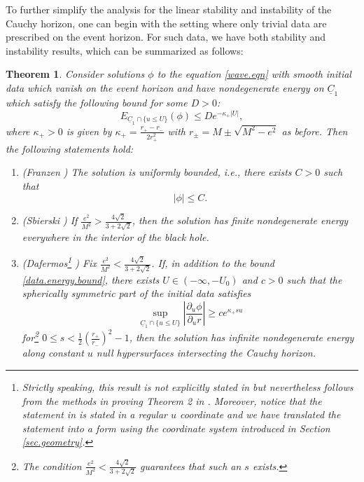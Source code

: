 \documentclass[12 pt, reqno]{amsart}
\newtheorem{theorem}{Theorem}[section]
\theoremstyle{definition}
\theoremstyle{remark}
\numberwithin{equation}{section}
\newcommand{\rd}{\partial}
\newcommand{\0}{\emptyset}
\newcommand{\f}{\frac}
\begin{document}
To further simplify the analysis for the linear stability and instability of the Cauchy horizon, one can begin with the setting where only trivial data are prescribed on the event horizon. For such data, we have both stability and instability results, which can be summarized as follows:
\begin{theorem}\label{thm.linear.hor}
Consider solutions $\phi$ to the equation \eqref{wave.eqn} with smooth initial data which vanish on the event horizon and have nondegenerate energy on $\underline C_1$ which satisfy the following bound for some $D>0$:
\begin{equation}\label{data.energy.bound}
E_{\underline C_1\cap \{u\leq U\}}(\phi)\leq De^{-\kappa_+ |U|},
\end{equation}
where $\kappa_+>0$ is given by $\kappa_+=\f{r_+-r_-}{2r_+^2}$ with $r_\pm=M\pm \sqrt{M^2-e^2}$ as before.
Then the following statements hold:
\begin{enumerate}
\item (Franzen \cite{Fra}) The solution is uniformly bounded, i.e., there exists $C>0$ such that
$$|\phi|\leq C.$$
\item (Sbierski \cite{Sbi.2}) If $\f{e^2}{M^2}>\f{4\sqrt 2}{3+2\sqrt 2}$, then the solution has finite nondegenerate energy everywhere in the interior of the black hole.
\item (Dafermos\footnote{Strictly speaking, this result is not explicitly stated in \cite{D1} but nevertheless follows from the methods in proving Theorem 2 in \cite{D1}. Moreover, notice that the statement in \cite{D1} is stated in a regular $u$ coordinate and we have translated the statement into a form using the coordinate system introduced in Section \ref{sec.geometry}.} \cite{D1}) Fix $\f{e^2}{M^2}<\f{4\sqrt 2}{3+2\sqrt 2}$. If, in addition to the bound \eqref{data.energy.bound}, there exists $U\in (-\infty,-U_0)$ and $c>0$ such that the spherically symmetric part of the initial data satisfies 
\begin{equation}\label{dafermos.trans.assumption}
\sup_{\underline C_1\cap \{u\leq U\}}|\f{\rd_u\phi}{\rd_u r}|\geq ce^{\kappa_+ s u}
\end{equation}
for\footnote{The condition $\f{e^2}{M^2}<\f{4\sqrt 2}{3+2\sqrt 2}$ guarantees that such an $s$ exists.} $0\leq s<\f 12(\f{r_+}{r_-})^2-1$, then the solution has infinite nondegenerate energy along constant $u$ null hypersurfaces intersecting the Cauchy horizon.
\end{enumerate}
\end{theorem}
\end{document}
